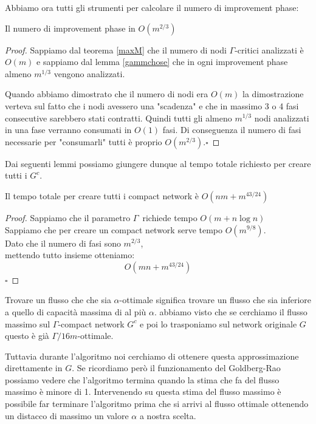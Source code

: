 \documentclass[a4paper, 11pt]{report}
\newcommand*{\QED}{\null\nobreak\hfill\ensuremath{\square}}%
\newcommand{\gmm}{$\Gamma$}
\begin{document}
Abbiamo ora tutti gli strumenti per calcolare il numero di improvement phase:
\begin{lemma}{}{}
    Il numero di improvement phase in $O(m^{2/3})$
\end{lemma}\begin{proof}
    Sappiamo dal teorema \ref{maxM} che il numero di nodi \gmm-critici analizzati è $O(m)$ e sappiamo dal lemma \ref{gammchose} che in ogni improvement phase almeno $m^{1/3}$ vengono analizzati.
    
    Quando abbiamo dimostrato che il numero di nodi era $O(m)$ la dimostrazione verteva sul fatto che i nodi avessero una "scadenza" e che in massimo 3 o 4 fasi consecutive sarebbero stati contratti.
    Quindi tutti gli almeno $m^{1/3}$ nodi analizzati in una fase verranno consumati in $O(1)$ fasi.
    Di conseguenza il numero di fasi necessarie per "consumarli" tutti è proprio $O(m^{2/3})$.\QED
\end{proof}

Dai seguenti lemmi possiamo giungere dunque al tempo totale richiesto per creare tutti i $G^c$.
\begin{lemma}{}{}
    Il tempo totale per creare tutti i compact network è $O(nm+m^{43/24})$
\end{lemma} 
\begin{proof}
    Sappiamo che il parametro \gmm\ richiede tempo $O(m+n\log n)$\\
    Sappiamo che per creare un compact network serve tempo $O(m^{9/8})$.\\
    Dato che il numero di fasi sono $m^{2/3}$,\\
    mettendo tutto insieme otteniamo:
    \[O(mn+m^{43/24} )\]
    \QED
\end{proof}

Trovare un flusso che che sia $\alpha$-ottimale significa trovare un flusso che sia inferiore a quello di capacità massima di al più $\alpha$.
abbiamo visto che se cerchiamo il flusso massimo sul \gmm-compact network $G^c$ e poi lo trasponiamo sul network originale $G$ questo è già $\Gamma/16m$-ottimale. 

Tuttavia durante l'algoritmo noi cerchiamo di ottenere questa approssimazione direttamente in $G$. 
Se ricordiamo però il funzionamento del Goldberg-Rao possiamo vedere che l'algoritmo termina quando la stima che fa del flusso massimo è minore di 1.
Intervenendo su questa stima del flusso massimo è possibile far terminare l'algoritmo prima che si arrivi al flusso ottimale ottenendo un distacco di massimo un valore $\alpha$ a nostra scelta.
\end{document}
